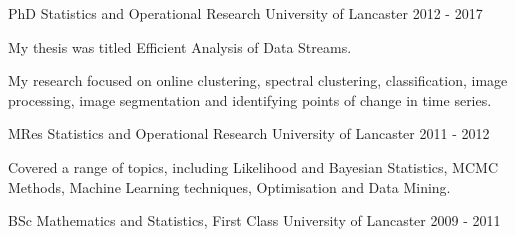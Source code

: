 \begin{cventries}
  \cventry
    {PhD Statistics and Operational Research}
    {University of Lancaster}
    {}
    {2012 - 2017}
    {
      \begin{cvitems}
        \item {My thesis was titled Efficient Analysis of Data Streams.}
        \item {My research focused on online clustering, spectral clustering, classification, image processing, image segmentation and identifying points of change in time series.}
      \end{cvitems}
    }

    \cventry
    {MRes Statistics and Operational Research}
    {University of Lancaster}
    {}
    {2011 - 2012}
    {
        \begin{cvitems}
        \item {Covered a range of topics, including Likelihood and Bayesian Statistics, MCMC Methods, Machine Learning techniques, Optimisation and Data Mining.}
      \end{cvitems}
     }
    
    \cventry
    {BSc Mathematics and Statistics, First Class}
    {University of Lancaster}
    {}
    {2009 - 2011}
    {}
\end{cventries}
